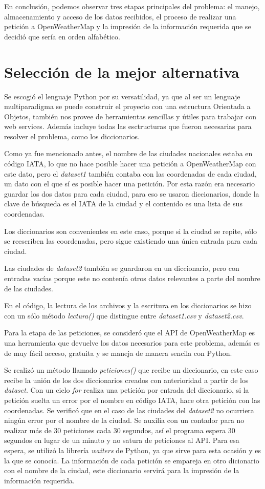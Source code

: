 \documentclass[]{article}
\begin{document}
En conclusión, podemos observar tres etapas principales del problema: 
el manejo, almacenamiento y acceso de los datos recibidos, el proceso de 
realizar una petición a OpenWeatherMap y la impresión de la información 
requerida que se decidió que sería en orden alfabético.

\section{Selección de la mejor alternativa}
Se escogió el lenguaje Python por su versatilidad, ya que al ser un lenguaje 
multiparadigma se puede construir el proyecto con una estructura Orientada 
a Objetos, también nos provee de herramientas sencillas y útiles para trabajar 
con web services. Además incluye todas las esctructuras que fueron 
necesarias para resolver el problema, como los diccionarios.

Como ya fue mencionado antes, el nombre de las ciudades nacionales estaba 
en código IATA, lo que no hace posible hacer una petición a OpenWeatherMap 
con este dato, pero el \emph{dataset1} también contaba con las coordenadas 
de cada ciudad, un dato con el que sí es posible hacer una petición. Por esta 
razón era necesario guardar los dos datos para cada ciudad, para eso se 
usaron diccionarios, donde la clave de búsqueda es el IATA de la ciudad y el 
contenido es una lista de sus coordenadas.

Los diccionarios son convenientes en este caso, porque si la ciudad se repite, 
sólo se reescriben las coordenadas, pero sigue existiendo una única entrada 
para cada ciudad.

Las ciudades de \emph{dataset2} también se guardaron en un diccionario, 
pero con entradas vacías porque este no contenía otros datos relevantes a 
parte del nombre de las ciudades.

En el código, la lectura de los archivos y la escritura en los diccionarios se 
hizo con un sólo método \emph{lectura()} que distingue entre
\emph{dataset1.csv} y \emph{dataset2.csv}.

Para la etapa de las peticiones, se consideró que el API de OpenWeatherMap 
es una herramienta que devuelve los datos necesarios para este problema, 
además es de muy fácil acceso, gratuita y se maneja de manera sencila con 
Python.

Se realizó un método llamado \emph{peticiones()} que recibe un diccionario, 
en este caso recibe la unión de los dos diccionarios creados con anterioridad 
a partir de los \emph{dataset}. Con un ciclo \emph{for} realiza una petición 
por entrada del diccionario, si la petición suelta un error por el nombre en 
código IATA, hace otra petición con las coordenadas. Se verificó que en el 
caso de las ciudades del \emph{dataset2} no ocurriera ningún error por el 
nombre de la ciudad. Se auxilia con un contador para no realizar más de 30 
peticiones cada 30 segundos, así el programa espera 30 segundos en lugar 
de un minuto y no satura de peticiones al API. Para esa espera, se utilizó la 
librería \emph{waiters} de Python, ya que sirve para esta ocasión y es la que 
se conocía. La información de cada petición se empareja en otro dicionario 
con el nombre de la ciudad, este diccionario servirá para la impresión de la 
información requerida.
\end{document}
